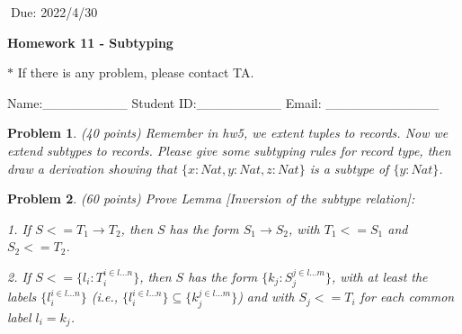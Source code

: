 \documentclass[12pt]{article}
\newtheorem{hw}{Problem}
\begin{document}
$\;$\hfill Due: 2022/4/30

\begin{center}
{\LARGE\bf Homework 11 - Subtyping}
\end{center}

\begin{center}
	\footnotesize{\color{red}$*$ If there is any problem, please contact TA.}
	
	\footnotesize{\color{blue} \quad Name:\_\_\_\_\_\_\_\_\_  \quad Student ID:\_\_\_\_\_\_\_\_\_ \quad Email: \_\_\_\_\_\_\_\_\_\_\_\_}
\end{center}

\begin{hw}\rm (40 points)
	Remember in hw5, we extent tuples to records. Now we extend subtypes to records. Please give some subtyping rules for record type, then draw a derivation showing that $\{x:Nat, y:Nat, z:Nat\}$ is a subtype of $\{y:Nat\}$.
\end{hw}

\begin{hw}\rm (60 points)
	Prove Lemma [Inversion of the subtype relation]:
	
	1. If $S <= T_1 \rightarrow T_2$, then $S$ has the form $S_1 \rightarrow S_2$, with $T_1 <= S_1$ and $S_2 <= T_2$.
	
	2. If $S <= \{l_i:T_i^{i \in l...n}\}$, then $S$ has the form $\{k_j:S_j^{j \in l...m}\}$, with at least the labels $\{l_i^{i \in l...n}\}$ (i.e., $\{l_i^{i \in l...n}\} \subseteq \{k_j^{j \in l...m}\}$) and with $S_j <= T_i$ for each common label $l_i=k_j$.
\end{hw}
\end{document}
